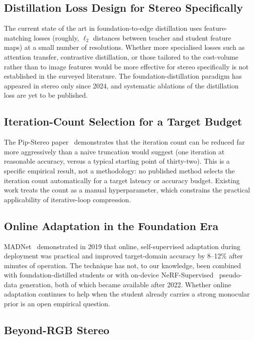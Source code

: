 \subsection{Distillation Loss Design for Stereo Specifically}

The current state of the art in foundation-to-edge distillation uses feature-matching losses (roughly, $\ell_2$ distances between teacher and student feature maps) at a small number of resolutions. Whether more specialised losses such as attention transfer, contrastive distillation, or those tailored to the cost-volume rather than to image features would be more effective for stereo specifically is not established in the surveyed literature. The foundation-distillation paradigm has appeared in stereo only since 2024, and systematic ablations of the distillation loss are yet to be published.

\subsection{Iteration-Count Selection for a Target Budget}

The Pip-Stereo paper~\cite{zheng2026pipstereo} demonstrates that the iteration count can be reduced far more aggressively than a naive truncation would suggest (one iteration at reasonable accuracy, versus a typical starting point of thirty-two). This is a specific empirical result, not a methodology: no published method selects the iteration count automatically for a target latency or accuracy budget. Existing work treats the count as a manual hyperparameter, which constrains the practical applicability of iterative-loop compression.

\subsection{Online Adaptation in the Foundation Era}

MADNet~\cite{tonioni2019madnet} demonstrated in 2019 that online, self-supervised adaptation during deployment was practical and improved target-domain accuracy by 8--12\% after minutes of operation. The technique has not, to our knowledge, been combined with foundation-distilled students or with on-device NeRF-Supervised~\cite{tosi2023nerfsupervised} pseudo-data generation, both of which became available after 2022. Whether online adaptation continues to help when the student already carries a strong monocular prior is an open empirical question.

\subsection{Beyond-RGB Stereo}

